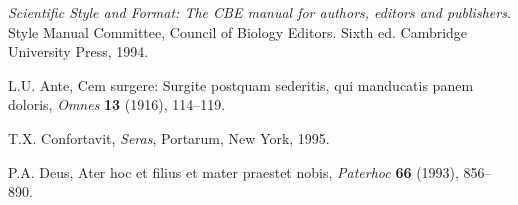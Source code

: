 \documentclass{article}
\begin{document}
\begin{thebibliography}{99}

\textit{Scientific Style and Format: The CBE manual for authors,
editors and publishers}. Style Manual Committee, Council of Biology Editors.
Sixth ed. Cambridge University Press, 1994.

L.U. Ante, Cem surgere: Surgite postquam sederitis, qui manducatis panem doloris,
\textit{Omnes} \textbf{13} (1916), 114--119.

T.X. Confortavit, \textit{Seras}, Portarum, New York, 1995.

P.A. Deus, Ater hoc et filius et mater praestet nobis,
\textit{Paterhoc} \textbf{66} (1993), 856--890.

\end{thebibliography}
\end{document}
